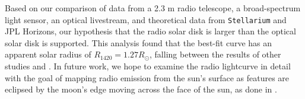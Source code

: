 Based on our comparison of data from a 2.3 m radio telescope, a broad-spectrum light sensor, an optical livestream, and theoretical data from \texttt{Stellarium} and JPL Horizons, our hypothesis that the radio solar disk is larger than the optical solar disk is supported.
This analysis found that the best-fit curve has an apparent solar radius of $R_{\mathrm{1420}} = 1.27 R_{\odot}$, falling between the results of other studies \cite{messerotti_radio_2000} and \cite{leung_solar_2022}.
In future work, we hope to examine the radio lightcurve in detail with the goal of mapping radio emission from the sun's surface as features are eclipsed by the moon's edge moving across the face of the sun, as done in \cite{messerotti_radio_2000}.
